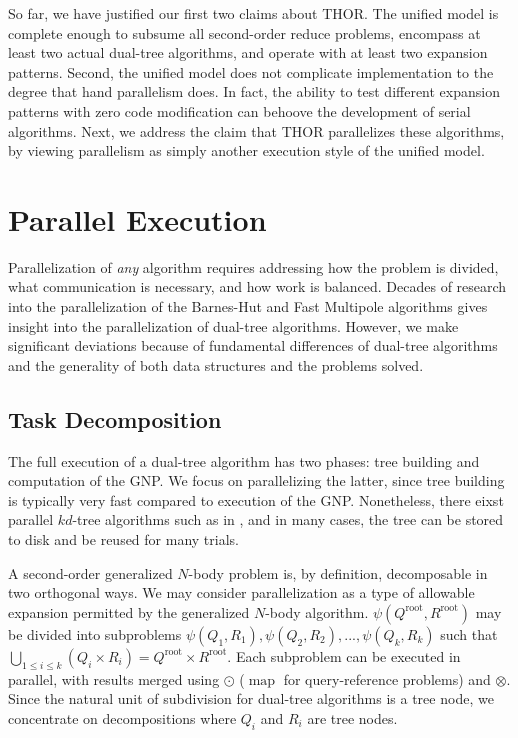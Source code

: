 \documentclass[twoside,leqno,twocolumn]{article}
\newcommand{\Union}{\bigcup}
\DeclareMathOperator*{\map}{map}
\newcommand{\gnp}{\psi}
\newcommand{\kdroot}[1]{#1^{\text{root}}}
\begin{document}
So far, we have justified our first two claims about THOR.
The unified model is complete enough to subsume all second-order reduce problems, encompass at least two actual dual-tree algorithms, and operate with at least two expansion patterns.
Second, the unified model does not complicate implementation to the degree that hand parallelism does.
In fact, the ability to test different expansion patterns with zero code modification can behoove the development of serial algorithms.
Next, we address the claim that THOR parallelizes these algorithms, by viewing parallelism as simply another execution style of the unified model.

\section{Parallel Execution}

Parallelization of {\em any} algorithm requires addressing how the problem is divided, what communication is necessary, and how work is balanced.
Decades of research into the parallelization of the Barnes-Hut and Fast Multipole algorithms gives insight into the parallelization of dual-tree algorithms.
However, we make significant deviations because of fundamental differences of dual-tree algorithms and the generality of both data structures and the problems solved.

\subsection{Task Decomposition}

The full execution of a dual-tree algorithm has two phases: tree building and computation of the GNP.
We focus on parallelizing the latter, since tree building is typically very fast compared to execution of the GNP.
Nonetheless, there eixst parallel $kd$-tree algorithms such as in \cite{alfuraih00parallel}, and in many cases, the tree can be stored to disk and be reused for many trials.

A second-order generalized $N$-body problem is, by definition, decomposable in two orthogonal ways.
We may consider parallelization as a type of allowable expansion permitted by the generalized $N$-body algorithm.
$\gnp(\kdroot{Q}, \kdroot{R})$ may be divided into subproblems $\gnp(Q_1,R_1), \gnp(Q_2,R_2), ..., \gnp(Q_k, R_k)$ such that $\Union_{1 \leq i \leq k} (Q_i \times R_i) = \kdroot{Q} \times \kdroot{R}$.
Each subproblem can be executed in parallel, with results merged using $\odot$ ($\map$ for query-reference problems) and $\otimes$.
Since the natural unit of subdivision for dual-tree algorithms is a tree node, we concentrate on decompositions where $Q_i$ and $R_i$ are tree nodes.
\end{document}
